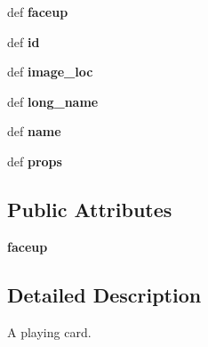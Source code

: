 \begin{DoxyCompactItemize}
\item 
\hypertarget{classcards-with-friends_1_1card_1_1_card_a4687e29552edfb03fab617a4c080d4c2}{def {\bfseries faceup}}\label{classcards-with-friends_1_1card_1_1_card_a4687e29552edfb03fab617a4c080d4c2}

\item 
\hypertarget{classcards-with-friends_1_1card_1_1_card_a46518ba0e98b70008634163813367f1b}{def {\bfseries id}}\label{classcards-with-friends_1_1card_1_1_card_a46518ba0e98b70008634163813367f1b}

\item 
\hypertarget{classcards-with-friends_1_1card_1_1_card_af1e2678dad417a035e5e8c4cdb238203}{def {\bfseries image\-\_\-loc}}\label{classcards-with-friends_1_1card_1_1_card_af1e2678dad417a035e5e8c4cdb238203}

\item 
\hypertarget{classcards-with-friends_1_1card_1_1_card_ac83e671bc78196396b1667543b273286}{def {\bfseries long\-\_\-name}}\label{classcards-with-friends_1_1card_1_1_card_ac83e671bc78196396b1667543b273286}

\item 
\hypertarget{classcards-with-friends_1_1card_1_1_card_a5afeb63d018a0d18ae14389f3700ea23}{def {\bfseries name}}\label{classcards-with-friends_1_1card_1_1_card_a5afeb63d018a0d18ae14389f3700ea23}

\item 
\hypertarget{classcards-with-friends_1_1card_1_1_card_a2674a275874007302935ef7506d71506}{def {\bfseries props}}\label{classcards-with-friends_1_1card_1_1_card_a2674a275874007302935ef7506d71506}

\end{DoxyCompactItemize}
\subsection*{Public Attributes}
\begin{DoxyCompactItemize}
\item 
\hypertarget{classcards-with-friends_1_1card_1_1_card_a693999e8d2a49be2e70a5ea5c66f2565}{{\bfseries faceup}}\label{classcards-with-friends_1_1card_1_1_card_a693999e8d2a49be2e70a5ea5c66f2565}

\end{DoxyCompactItemize}


\subsection{Detailed Description}
\begin{DoxyVerb}A playing card.\end{DoxyVerb}
 

